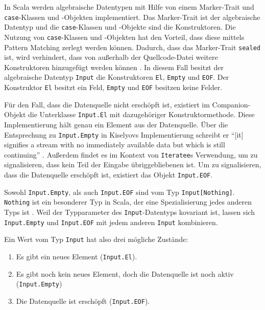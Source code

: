 \documentclass[draft=false
              ,paper=a4
              ,twoside=false
              ,fontsize=11pt
              ,headsepline
              ,BCOR10mm
              ,DIV11
              ]{scrbook}
\begin{document}
In Scala werden algebraische Datentypen mit Hilfe von einem Marker-Trait und \lstinline|case|-Klassen und -Objekten implementiert.
Das Marker-Trait ist der algebraische Datentyp und die \lstinline|case|-Klassen und -Objekte sind die Konstruktoren.
Die Nutzung von \lstinline|case|-Klassen und -Objekten hat den Vorteil, dass diese mittels Pattern Matching zerlegt werden können.
Dadurch, dass das Marker-Trait \lstinline|sealed| ist, wird verhindert, dass von außerhalb der Quellcode-Datei weitere Konstruktoren hinzugefügt werden können \cite[vgl.][]{algebraic_data_type_scala}.
In diesem Fall besitzt der algebraische Datentyp \lstinline|Input| die Konstruktoren \lstinline|El|, \lstinline|Empty| und \lstinline|EOF|.
Der Konstruktor \lstinline|El| besitzt ein Feld, \lstinline|Empty| und \lstinline|EOF| besitzen keine Felder.

Für den Fall, dass die Datenquelle nicht erschöpft ist, existiert im Companion-Objekt die Unterklasse \lstinline|Input.El| mit dazugehöriger Konstruktormethode.
Diese Implementierung hält genau ein Element aus der Datenquelle.
Über die Entsprechung zu \lstinline|Input.Empty| in Kiselyovs Implementierung schreibt er "`[it] signifies a stream with no immediately available data but which is still continuing"' \cite[vgl.][]{iteratee_io}.
Außerdem findet es im Kontext von \lstinline|Iteratee|s Verwendung, um zu signalisieren, dass kein Teil der Eingabe übriggebliebenen ist.
Um zu signalisieren, dass die Datenquelle erschöpft ist, existiert das Objekt \lstinline|Input.EOF|.

Sowohl \lstinline|Input.Empty|, als auch \lstinline|Input.EOF| sind vom Typ \lstinline|Input[Nothing]|.
\lstinline|Nothing| ist ein besonderer Typ in Scala, der eine Spezialisierung jedes anderen Typs ist \cite[vgl.][S.~32]{scala_specification}.
Weil der Typparameter des \lstinline|Input|-Datentyps kovariant ist, lassen sich \lstinline|Input.Empty| und \lstinline|Input.EOF| mit jedem anderen \lstinline|Input| kombinieren.

Ein Wert vom Typ \lstinline|Input| hat also drei mögliche Zustände:
\begin{enumerate}
  \item Es gibt ein neues Element (\lstinline|Input.El|).
  \item Es gibt noch kein neues Element, doch die Datenquelle ist noch aktiv (\lstinline|Input.Empty|)
  \item Die Datenquelle ist erschöpft (\lstinline|Input.EOF|).
\end{enumerate}
\end{document}
